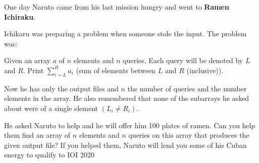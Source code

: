 One day Naruto came from his last mission hungry and went to \textbf{Ramen Ichiraku}.

Ichikaru was preparing a problem when someone stole the input. The problem was: 

Given an array $a$ of $n$ elements and $n$ queries, Each query will be denoted by $L$ and $R$. Print $\sum\limits_{i=L}^R a_i$ (sum of elements between $L$ and $R$ (inclusive)).

Now he has only the output files and $n$ the number of queries and the number elements in the array. He also remembered that none of the subarrays he asked about were of a single element $(L_i \neq R_i)$.

He asked Naruto to help and he will offer him 100 plates of ramen. Can you help them find an array of $n$ elements and $n$ queries on this array that produces the given output file? If you helped them, Naruto will lend you some of his Cuban energy to qualify to IOI 2020